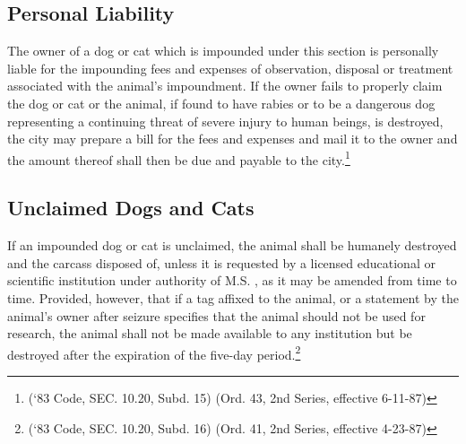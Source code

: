 \subsection{Personal Liability}
The owner of a dog or cat which is impounded under this section is personally liable for the impounding fees and expenses of observation, disposal or treatment associated with the animal’s impoundment.  If the owner fails to properly claim the dog or cat or the animal, if found to have rabies or to be a dangerous dog representing a continuing threat of severe injury to human beings, is destroyed, the city may prepare a bill for the fees and expenses and mail it to the owner and the amount thereof shall then be due and payable to the city.\footnote{(‘83 Code, SEC. 10.20, Subd. 15)  (Ord. 43, 2nd Series, effective 6-11-87)}
\subsection{Unclaimed Dogs and Cats}
If an impounded dog or cat is unclaimed, the animal shall be humanely destroyed and the carcass disposed of, unless it is requested by a licensed educational or scientific institution under authority of M.S. , as it may be amended from time to time.  Provided, however, that if a tag affixed to the animal, or a statement by the animal’s owner after seizure specifies that the animal should not be used for research, the animal shall not be made available to any institution but be destroyed after the expiration of the five-day period.\footnote{(‘83 Code, SEC. 10.20, Subd. 16)  (Ord. 41, 2nd Series, effective 4-23-87)}
